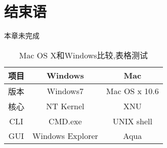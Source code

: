 \chapter*{结束语}
本章未完成

\begin{table}
	\center
	\caption{Mac OS X和Windows比较,表格测试}
	\begin{tabular}[t!]{ccc}
	\hline
	项目 & Windows & Mac \\
	\hline
	版本 & Windows7 & Mac OS x 10.6 \\
	核心 & NT Kernel & XNU \\
	CLI  & CMD.exe & UNIX shell \\
	GUI  &  Windows Explorer & Aqua \\
	\hline
\end{tabular}
\end{table}

